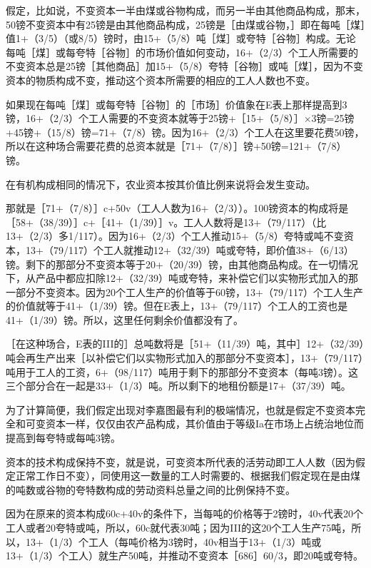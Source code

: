 假定，比如说，不变资本一半由煤或谷物构成，而另一半由其他商品构成，那末，50镑不变资本中有25镑是由其他商品构成，25镑是［由煤或谷物，］即在每吨［煤］值1+（3/5）（或8/5）镑时，由15+（5/8）吨［煤］或夸特［谷物］构成。无论每吨［煤］或每夸特［谷物］的市场价值如何变动，16+（2/3）个工人所需要的不变资本总是25镑［其他商品］加15+（5/8）夸特［谷物］或吨［煤］，因为不变资本的物质构成不变，推动这个资本所需要的相应的工人人数也不变。

如果现在每吨［煤］或每夸特［谷物］的［市场］价值象在E表上那样提高到3镑，16+（2/3）个工人需要的不变资本就等于25镑+［15+（5/8）］×3镑=25镑+45镑+（15/8）镑=71+（7/8）镑。因为16+（2/3）个工人在这里要花费50镑，所以在这种场合需要花费的总资本就是［71+（7/8）］镑+50镑=121+（7/8）镑。

在有机构成相同的情况下，农业资本按其价值比例来说将会发生变动。

那就是［71+（7/8）］c+50v（工人人数为16+（2/3））。100镑资本的构成将是［58+（38/39）］c+［41+（1/39）］v。工人人数将是13+（79/117）（比13+（2/3）多1/117）。因为16+（2/3）个工人推动15+（5/8）夸特或吨不变资本，13+（79/117）个工人就推动12+（32/39）吨或夸特，即价值38+（6/13）镑。剩下的那部分不变资本等于20+（20/39）镑，由其他商品构成。在一切情况下，从产品中都应扣除12+（32/39）吨或夸特，来补偿它们以实物形式加入的那一部分不变资本。因为20个工人生产的价值等于60镑，13+（79/117）个工人生产的价值就等于41+（1/39）镑。但在E表上，13+（79/117）个工人的工资也是41+（1/39）镑。所以，这里任何剩余价值都没有了。

［在这种场合，E表的III的］总吨数将是［51+（11/39）吨，其中］12+（32/39）吨会再生产出来［以补偿它们以实物形式加入的那部分不变资本］，13+（79/117）吨用于工人的工资，6+（98/117）吨用于剩下的那部分不变资本（每吨3镑）。这三个部分合在一起是33+（1/3）吨。所以剩下的地租份额是17+（37/39）吨。

为了计算简便，我们假定出现对李嘉图最有利的极端情况，也就是假定不变资本完全和可变资本一样，仅仅由农产品构成，其价值由于等级Ia在市场上占统治地位而提高到每夸特或每吨3镑。

资本的技术构成保持不变，就是说，可变资本所代表的活劳动即工人人数（因为假定正常工作日不变），同使用这一数量的工人时需要的、根据我们假定现在是由煤的吨数或谷物的夸特数构成的劳动资料总量之间的比例保持不变。

因为在原来的资本构成60c+40v的条件下，当每吨的价格等于2镑时，40v代表20个工人或者20夸特或吨，所以，60c就代表30吨；因为III的这20个工人生产75吨，所以，13+（1/3）个工人（每吨价格为3镑时，40v相当于13+（1/3）吨或13+（1/3）个工人）就生产50吨，并推动不变资本［686］60/3，即20吨或夸特。

